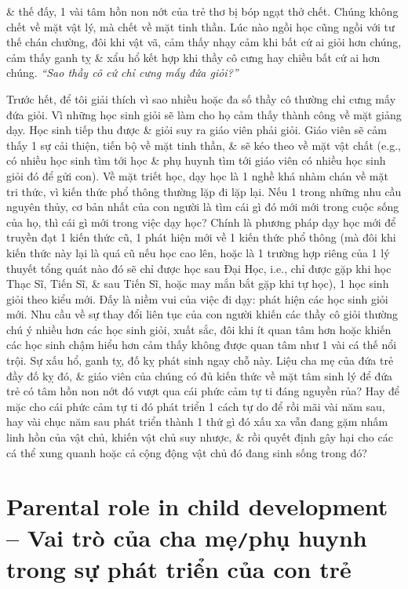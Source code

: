\documentclass[12pt,oneside]{book}
\begin{document}
\& thế đấy, 1 vài tâm hồn non nớt của trẻ thơ bị bóp ngạt thở chết. Chúng không chết về mặt vật lý, mà chết về mặt tinh thần. Lúc nào ngồi học cũng ngồi với tư thế chán chường, đôi khi vật vã, cảm thấy nhạy cảm khi bất cứ ai giỏi hơn chúng, cảm thấy ganh tỵ \& xẩu hổ kết hợp khi thầy cô cưng hay chiều bất cứ ai hơn chúng. {\it``Sao thầy cô cứ chỉ cưng mấy đứa giỏi?''}

Trước hết, để tôi giải thích vì sao nhiều hoặc đa số thầy cô thường chỉ cưng mấy đứa giỏi. Vì những học sinh giỏi sẽ làm cho họ cảm thấy thành công về mặt giảng dạy. Học sinh tiếp thu được \& giỏi suy ra giáo viên phải giỏi. Giáo viên sẽ cảm thấy 1 sự cải thiện, tiến bộ về mặt tinh thần, \& sẽ kéo theo về mặt vật chất (e.g., có nhiều học sinh tìm tới học \& phụ huynh tìm tới giáo viên có nhiều học sinh giỏi đó để gửi con). Về mặt triết học, dạy học là 1 nghề khá nhàm chán về mặt tri thức, vì kiến thức phổ thông thường lặp đi lặp lại. Nếu 1 trong những nhu cầu nguyên thủy, cơ bản nhất của con người là tìm cái gì đó mới mới trong cuộc sống của họ, thì cái gì mới trong việc dạy học? Chính là phương pháp dạy học mới để truyền đạt 1 kiến thức cũ, 1 phát hiện mới về 1 kiến thức phổ thông (mà đôi khi kiến thức này lại là quá cũ nếu học cao lên, hoặc là 1 trường hợp riêng của 1 lý thuyết tổng quát nào đó sẽ chỉ được học sau Đại Học, i.e., chỉ được gặp khi học Thạc Sĩ, Tiến Sĩ, \& sau Tiến Sĩ, hoặc may mắn bắt gặp khi tự học), 1 học sinh giỏi theo kiểu mới. Đấy là niềm vui của việc đi dạy: phát hiện các học sinh giỏi mới. Nhu cầu về sự thay đổi liên tục của con người khiến các thầy cô giỏi thường chú ý nhiều hơn các học sinh giỏi, xuất sắc, đôi khi ít quan tâm hơn hoặc khiến các học sinh chậm hiểu hơn cảm thấy không được quan tâm như 1 vài cá thế nổi trội. Sự xấu hổ, ganh tỵ, đố kỵ phát sinh ngay chỗ này. Liệu cha mẹ của đứa trẻ đầy đố kỵ đó, \& giáo viên của chúng có đủ kiến thức về mặt tâm sinh lý để đứa trẻ có tâm hồn non nớt đó vượt qua cái phức cảm tự ti đáng nguyền rủa? Hay để mặc cho cái phức cảm tự ti đó phát triển 1 cách tự do để rồi mãi vài năm sau, hay vài chục năm sau phát triển thành 1 thứ gì đó xấu xa vẫn đang gặm nhấm linh hồn của vật chủ, khiến vật chủ suy nhược, \& rồi quyết định gây hại cho các cá thể xung quanh hoặc cả cộng động vật chủ đó đang sinh sống trong đó?
	

\section{Parental role in child development -- Vai trò của cha mẹ{\tt/}phụ huynh trong sự phát triển của con trẻ}
\end{document}
